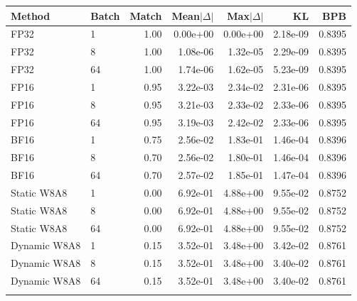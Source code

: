 \begin{tabular}{llrrrrr}
\toprule
Method & Batch & Match & Mean$|\Delta|$ & Max$|\Delta|$ & KL & BPB \\
\midrule
FP32 & 1 & 1.00 & 0.00e+00 & 0.00e+00 & 2.18e-09 & 0.8395 \\
FP32 & 8 & 1.00 & 1.08e-06 & 1.32e-05 & 2.29e-09 & 0.8395 \\
FP32 & 64 & 1.00 & 1.74e-06 & 1.62e-05 & 5.23e-09 & 0.8395 \\
\addlinespace
FP16 & 1 & 0.95 & 3.22e-03 & 2.34e-02 & 2.31e-06 & 0.8395 \\
FP16 & 8 & 0.95 & 3.21e-03 & 2.33e-02 & 2.33e-06 & 0.8395 \\
FP16 & 64 & 0.95 & 3.19e-03 & 2.42e-02 & 2.33e-06 & 0.8395 \\
\addlinespace
BF16 & 1 & 0.75 & 2.56e-02 & 1.83e-01 & 1.46e-04 & 0.8396 \\
BF16 & 8 & 0.70 & 2.56e-02 & 1.80e-01 & 1.46e-04 & 0.8396 \\
BF16 & 64 & 0.70 & 2.57e-02 & 1.85e-01 & 1.47e-04 & 0.8396 \\
\addlinespace
Static W8A8 & 1 & 0.00 & 6.92e-01 & 4.88e+00 & 9.55e-02 & 0.8752 \\
Static W8A8 & 8 & 0.00 & 6.92e-01 & 4.88e+00 & 9.55e-02 & 0.8752 \\
Static W8A8 & 64 & 0.00 & 6.92e-01 & 4.88e+00 & 9.55e-02 & 0.8752 \\
\addlinespace
Dynamic W8A8 & 1 & 0.15 & 3.52e-01 & 3.48e+00 & 3.42e-02 & 0.8761 \\
Dynamic W8A8 & 8 & 0.15 & 3.52e-01 & 3.48e+00 & 3.40e-02 & 0.8761 \\
Dynamic W8A8 & 64 & 0.15 & 3.52e-01 & 3.48e+00 & 3.40e-02 & 0.8761 \\
\addlinespace
\bottomrule
\end{tabular}
